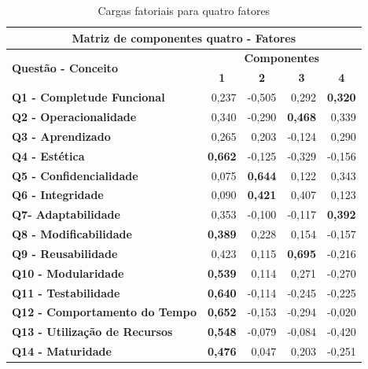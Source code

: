 \begin{apendicesenv}
    \begin{longtable}{rrrrr}
    \caption{Cargas fatoriais para quatro fatores}
        \label{4-fatores}
    \\\hline
    \multicolumn{5}{c}{\textbf{Matriz de componentes quatro - Fatores}} \\
    \hline
    \multicolumn{1}{l}{\multirow{2}[2]{*}{\textbf{Questão - Conceito}}} & \multicolumn{4}{c}{\textbf{Componentes}} \\
    \multicolumn{1}{l}{} & \multicolumn{1}{c}{\textbf{1}} & \multicolumn{1}{c}{\textbf{2}} & \multicolumn{1}{c}{\textbf{3}} & \multicolumn{1}{c}{\textbf{4}} \\
    \multicolumn{1}{l}{\textbf{Q1 - Completude Funcional}} & 0,237  & -0,505 & 0,292  & \textbf{0,320} \\
    \multicolumn{1}{l}{\textbf{Q2 - Operacionalidade}} & 0,340  & -0,290 & \textbf{0,468} & 0,339 \\
    \multicolumn{1}{l}{\textbf{Q3 - Aprendizado}} & 0,265  & 0,203  & -0,124 & 0,290 \\
    \multicolumn{1}{l}{\textbf{Q4 - Estética}} & \textbf{0,662} & -0,125 & -0,329 & -0,156 \\
    \multicolumn{1}{l}{\textbf{Q5 - Confidencialidade}} & 0,075  & \textbf{0,644} & 0,122  & 0,343 \\
    \multicolumn{1}{l}{\textbf{Q6 - Integridade}} & 0,090  & \textbf{0,421} & 0,407  & 0,123 \\
    \multicolumn{1}{l}{\textbf{Q7- Adaptabilidade}} & 0,353  & -0,100 & -0,117 & \textbf{0,392} \\
    \multicolumn{1}{l}{\textbf{Q8 - Modificabilidade}} & \textbf{0,389} & 0,228  & 0,154  & -0,157 \\
    \multicolumn{1}{l}{\textbf{Q9 - Reusabilidade}} & 0,423  & 0,115  & \textbf{0,695} & -0,216 \\
    \multicolumn{1}{l}{\textbf{Q10 - Modularidade}} & \textbf{0,539} & 0,114  & 0,271  & -0,270 \\
    \multicolumn{1}{l}{\textbf{Q11 - Testabilidade}} & \textbf{0,640} & -0,114 & -0,245 & -0,225 \\
    \multicolumn{1}{l}{\textbf{Q12 - Comportamento do Tempo}} & \textbf{0,652} & -0,153 & -0,294 & -0,020 \\
    \multicolumn{1}{l}{\textbf{Q13 - Utilização de Recursos}} & \textbf{0,548} & -0,079 & -0,084 & -0,420 \\
    \multicolumn{1}{l}{\textbf{Q14 - Maturidade}} & \textbf{0,476} & 0,047  & 0,203  & -0,251 \\

\end{longtable}
\end{apendicesenv}
